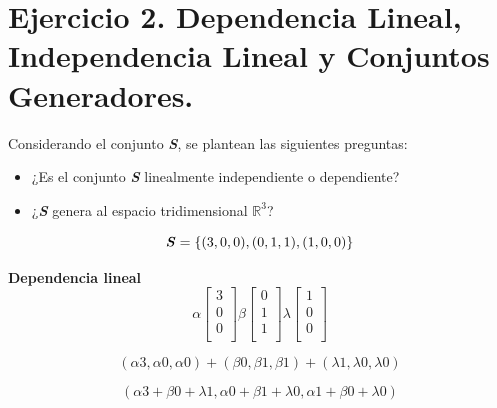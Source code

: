 
\section{\large Ejercicio 2. Dependencia Lineal, Independencia Lineal y Conjuntos Generadores.}

Considerando el conjunto \textbf{\textit{S}}, se plantean las siguientes preguntas:
\begin{itemize}
    \item ¿Es el conjunto \textbf{\textit{S}} linealmente independiente o dependiente?
    \item ¿\textbf{\textit{S}} genera al espacio tridimensional $\mathbb{R}^3$?
\end{itemize}

\[
    \text{\textbf{\textit{S}}}=\left\{(3,0,0),(0,1,1),(1,0,0)\right\}
\]

\textbf{Dependencia lineal}
\[
    \alpha\begin{bmatrix}
        3 \\
        0 \\
        0 \\
    \end{bmatrix}
    \beta\begin{bmatrix}
        0 \\
        1 \\
        1 \\
    \end{bmatrix}
    \lambda\begin{bmatrix}
        1 \\
        0 \\
        0 \\
    \end{bmatrix}
\]

\[
    (\alpha3,\alpha0,\alpha0)+(\beta0,\beta1,\beta1)+(\lambda1,\lambda0,\lambda0)
\]


\[
    (\alpha3+\beta0+\lambda1,\alpha0+\beta1+\lambda0,\alpha1+\beta0+\lambda0)
\]

